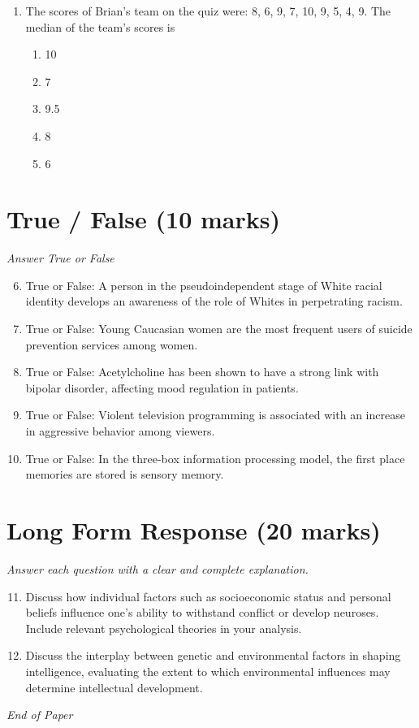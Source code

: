 \documentclass[12pt]{article}
\begin{document}
\begin{enumerate}[label=\arabic*.]
\begin{enumerate}[label=(\alph*)]
    \item Adlerian
    \item reality
    \item person-centered
    \item existential
    \item Gestalt
\end{enumerate}
\item The scores of Brian's team on the quiz were: 8, 6, 9, 7, 10, 9, 5, 4, 9. The median of the team's scores is
\begin{enumerate}[label=(\alph*)]
    \item 10
    \item 7
    \item 9.5
    \item 8
    \item 6
\end{enumerate}
\end{enumerate}

\section*{True / False (10 marks)}
\textit{Answer True or False}
\begin{enumerate}[label=\arabic*.]
\setcounter{enumi}{5}
\item True or False: A person in the pseudoindependent stage of White racial identity develops an awareness of the role of Whites in perpetrating racism.
\item True or False: Young Caucasian women are the most frequent users of suicide prevention services among women.
\item True or False: Acetylcholine has been shown to have a strong link with bipolar disorder, affecting mood regulation in patients.
\item True or False: Violent television programming is associated with an increase in aggressive behavior among viewers.
\item True or False: In the three-box information processing model, the first place memories are stored is sensory memory.
\end{enumerate}

\section*{Long Form Response (20 marks)}
\textit{Answer each question with a clear and complete explanation.}
\begin{enumerate}[label=\arabic*.]
\setcounter{enumi}{10}
\item Discuss how individual factors such as socioeconomic status and personal beliefs influence one's ability to withstand conflict or develop neuroses. Include relevant psychological theories in your analysis.
\item Discuss the interplay between genetic and environmental factors in shaping intelligence, evaluating the extent to which environmental influences may determine intellectual development.
\end{enumerate}

\vfill
\noindent\textit{End of Paper}
\end{document}
